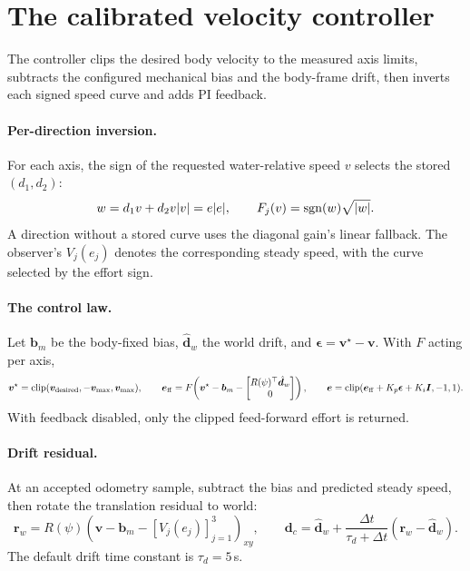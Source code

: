 \section{The calibrated velocity controller}
\label{sec:controller}

The controller clips the desired body velocity to the measured axis limits,
subtracts the configured mechanical bias and the body-frame drift, then
inverts each signed speed curve and adds PI feedback.

\paragraph{Per-direction inversion.} For each axis, the sign of the requested
water-relative speed $v$ selects the stored $(d_1,d_2)$:
\[
  w=d_1v+d_2v|v|=e|e|,\qquad F_j(v)=\operatorname{sgn}(w)\sqrt{|w|}.
\]
A direction without a stored curve uses the diagonal gain's linear fallback.
The observer's $V_j(e_j)$ denotes the corresponding steady speed, with the
curve selected by the effort sign.

\paragraph{The control law.} Let $\bm b_m$ be the body-fixed bias,
$\hat{\bm d}_w$ the world drift, and $\bm\epsilon=\bm v^\star-\bm v$.
With $F$ acting per axis,
\[
  \bm v^\star=\operatorname{clip}(\bm v_{\rm desired},-\bm v_{\max},\bm v_{\max}),\qquad
  \bm e_{\rm ff}=F\!\left(\bm v^\star-\bm b_m-
       \begin{bmatrix}R(\psi)^\top\hat{\bm d}_w\\0\end{bmatrix}\right),\qquad
  \bm e=\operatorname{clip}(\bm e_{\rm ff}+K_p\bm\epsilon+K_i\bm I,-1,1).
\]
With feedback disabled, only the clipped feed-forward effort is returned.

\paragraph{Drift residual.} At an accepted odometry sample, subtract the
bias and predicted steady speed, then rotate the translation residual to world:
\[
  \bm r_w=R(\psi)\left(\bm v-\bm b_m-
    [V_j(e_j)]_{j=1}^3\right)_{xy},\qquad
  \bm d_c=\hat{\bm d}_w+\frac{\Delta t}{\tau_d+\Delta t}
                 (\bm r_w-\hat{\bm d}_w).
\]
The default drift time constant is $\tau_d=5$\,s.

